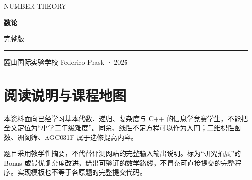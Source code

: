 \documentclass[UTF8,a4paper,11pt,oneside,openany,fontset=fandol]{ctexbook}
\theoremstyle{definition}
\begin{document}
\frontmatter
\begin{titlepage}
\setlength{\parindent}{0pt}
\vspace*{1.2cm}
{\large\color{accent}NUMBER THEORY}\par
\vspace{1cm}
{\fontsize{46}{56}\selectfont\bfseries\color{ink}数论}\par
\vspace{0.5cm}
{\Large 完整版}\par
\vspace{0.5cm}
{\color{accent}\rule{\textwidth}{1.2pt}}\par
\vspace{0.3cm}
\begin{minipage}{0.9\textwidth}
\large 麓山国际实验学校 Federico Prask · 2026
\end{minipage}\par
\vfill
{\normalsize }\par
{\small}
\end{titlepage}
\chapter*{阅读说明与课程地图}

\begin{pitfall}[适用范围与阅读边界]
本资料面向已经学习基本代数、递归、复杂度与 C++ 的信息学竞赛学生，不能把全文定位为“小学二年级难度”。同余、线性不定方程可以作为入门；二维积性函数、洲阁筛、AGC031F 属于选修提高内容。

题目采用教学性摘要，不代替评测网站的完整输入输出说明。标为“研究拓展”的 Bonus 或最优复杂度改进，给出可验证的数学路线，不冒充可直接提交的完整程序。实现模板也不等于各原题的完整提交代码。
\end{pitfall}
\end{document}
